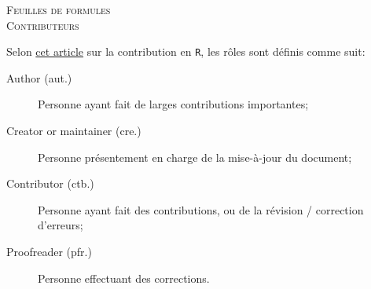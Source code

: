 \documentclass[10pt, french]{article}
\begin{document}
\center %

\textsc{\LARGE Feuilles de formules}\\[0.5cm]
\textsc{\Large Contributeurs}\\[0.5cm] 

\begin{terminologie}[Rôles]
Selon \href{https://journal.r-project.org/archive/2012-1/RJournal_2012-1_Hornik~et~al.pdf}{cet article} sur la contribution en \texttt{R}, les rôles sont définis comme suit:
\begin{description}
	\item[Author (aut.)]	Personne ayant fait de larges contributions importantes;
	\item[Creator or maintainer (cre.)]	Personne présentement en charge de la mise-à-jour du document;
	\item[Contributor (ctb.)]	Personne ayant fait des contributions, ou de la révision / correction d'erreurs;
	\item[Proofreader (pfr.)]	Personne effectuant des corrections.
\end{description}
\end{terminologie}
\end{document}
